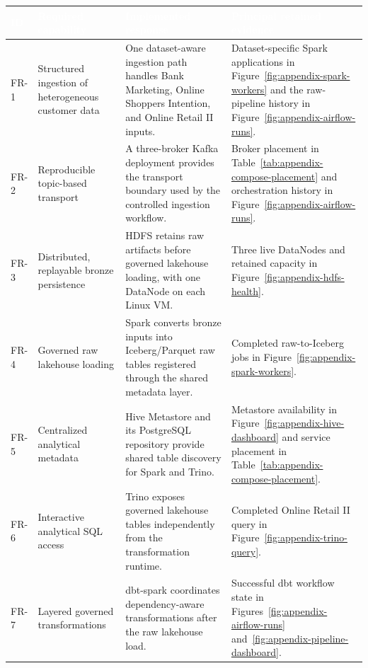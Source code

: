 \begin{table}[H]
    \centering
    \scriptsize
    \renewcommand{\arraystretch}{1.12}
    \begin{tabularx}{\textwidth}{|L{1.0cm}|L{3.7cm}|Y|L{3.6cm}|}
        \hline
        \textcolor{white}{\textbf{ID}} & \textcolor{white}{\textbf{Required capability}} & \textcolor{white}{\textbf{Implemented response}} & \textcolor{white}{\textbf{Principal retained evidence}} \\
        \hline
        FR-1 & Structured ingestion of heterogeneous customer data & One dataset-aware ingestion path handles Bank Marketing, Online Shoppers Intention, and Online Retail II inputs. & Dataset-specific Spark applications in Figure~\ref{fig:appendix-spark-workers} and the raw-pipeline history in Figure~\ref{fig:appendix-airflow-runs}. \\
        \hline
        FR-2 & Reproducible topic-based transport & A three-broker Kafka deployment provides the transport boundary used by the controlled ingestion workflow. & Broker placement in Table~\ref{tab:appendix-compose-placement} and orchestration history in Figure~\ref{fig:appendix-airflow-runs}. \\
        \hline
        FR-3 & Distributed, replayable bronze persistence & HDFS retains raw artifacts before governed lakehouse loading, with one DataNode on each Linux VM. & Three live DataNodes and retained capacity in Figure~\ref{fig:appendix-hdfs-health}. \\
        \hline
        FR-4 & Governed raw lakehouse loading & Spark converts bronze inputs into Iceberg/Parquet raw tables registered through the shared metadata layer. & Completed raw-to-Iceberg jobs in Figure~\ref{fig:appendix-spark-workers}. \\
        \hline
        FR-5 & Centralized analytical metadata & Hive Metastore and its PostgreSQL repository provide shared table discovery for Spark and Trino. & Metastore availability in Figure~\ref{fig:appendix-hive-dashboard} and service placement in Table~\ref{tab:appendix-compose-placement}. \\
        \hline
        FR-6 & Interactive analytical SQL access & Trino exposes governed lakehouse tables independently from the transformation runtime. & Completed Online Retail II query in Figure~\ref{fig:appendix-trino-query}. \\
        \hline
        FR-7 & Layered governed transformations & dbt-spark coordinates dependency-aware transformations after the raw lakehouse load. & Successful dbt workflow state in Figures~\ref{fig:appendix-airflow-runs} and~\ref{fig:appendix-pipeline-dashboard}. \\

\end{tabularx}
\end{table}
